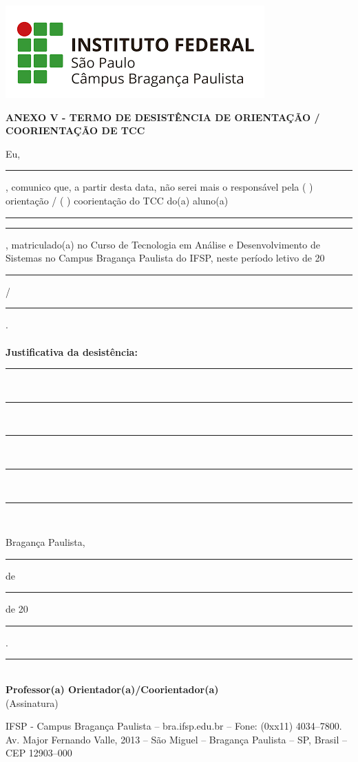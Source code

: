 \documentclass[12pt,a4paper]{report}
\newcommand{\cabecalho}{ANEXO V - TERMO DE DESISTÊNCIA DE ORIENTAÇÃO / COORIENTAÇÃO DE TCC}
\begin{document}
	\includegraphics[scale=0.35]{IFSP-BRA.png}	
\vspace{1.2cm}
	\begin{center}
		{\large\textbf{\cabecalho}}\\
	\end{center}
	
	\vspace{1.2cm}
	\noindent Eu, \rule{12cm}{0.1pt}, comunico que, a partir desta data, não serei mais o responsável pela (\hspace{0.4cm} ) orientação / ( \hspace{0.4cm} ) coorientação do TCC do(a) aluno(a) \rule{9.5cm}{0.1pt} \rule{9.5cm}{0.1pt}, matriculado(a) no Curso de Tecnologia em Análise e Desenvolvimento de Sistemas no Campus Bragança Paulista do IFSP, neste período letivo de 20\rule{1cm}{0.1pt} \hspace{0.01cm}/\rule{1cm}{0.1pt} \hspace{0.01cm}. \\
	\\
	\noindent \textbf{Justificativa da desistência:} \rule{10cm}{0.1pt} \\
	\rule{17cm}{0.1pt} \\
	\rule{17cm}{0.1pt} \\
	\rule{17cm}{0.1pt} \\
	\rule{17cm}{0.1pt} \\
    
    \begin{center}
        {Bragança Paulista, \rule{1cm}{0.1pt} de \rule{5cm}{0.1pt} de 20\rule{1cm}{0.1pt}.}
	\end{center}
	\vspace{2cm}
	\begin{table}[ht]
		\centering \rule{10cm}{0.1pt}               
		\\ \small{\textbf{Professor(a) Orientador(a)/Coorientador(a)}}
		\\ \small{(Assinatura)}
	\end{table}

    \vspace{6cm}
	\hline
	\vspace{0.2cm}

	\centering \tiny{IFSP - Campus Bragança Paulista – bra.ifsp.edu.br – Fone: (0xx11) 4034–7800.
Av. Major Fernando Valle, 2013 – São Miguel – Bragança Paulista – SP, Brasil – CEP 12903–000}
\end{document}
